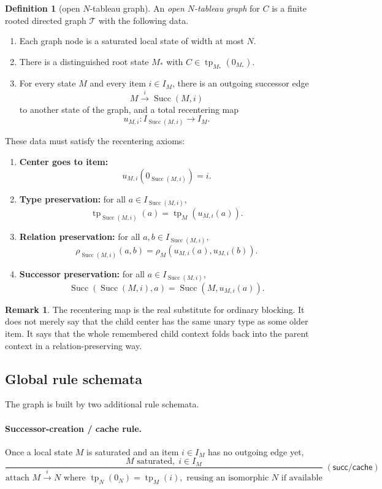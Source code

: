 \documentclass[11pt]{article}
\theoremstyle{definition}
\newtheorem{definition}[theorem]{Definition}
\newtheorem{remark}[theorem]{Remark}
\newcommand{\tp}{\operatorname{tp}}
\newcommand{\Succ}{\operatorname{Succ}}
\begin{document}
\begin{definition}[open $N$-tableau graph]
An \emph{open $N$-tableau graph} for $C$ is a finite rooted directed graph $\mathcal T$ with the following data.
\begin{enumerate}[label=(G\arabic*)]
    \item Each graph node is a saturated local state of width at most $N$.
    \item There is a distinguished root state $M_\ast$ with $C\in \tp_{M_\ast}(0_{M_\ast})$.
    \item For every state $M$ and every item $i\in I_M$, there is an outgoing successor edge
    \[
    M \xrightarrow{i} \Succ(M,i)
    \]
    to another state of the graph, and a total recentering map
    \[
    u_{M,i}: I_{\Succ(M,i)} \to I_M.
    \]
\end{enumerate}
These data must satisfy the recentering axioms:
\begin{enumerate}[label=(R\arabic*)]
    \item \textbf{Center goes to item:}
    \[
    u_{M,i}(0_{\Succ(M,i)})=i.
    \]
    \item \textbf{Type preservation:} for all $a\in I_{\Succ(M,i)}$,
    \[
    \tp_{\Succ(M,i)}(a)=\tp_M(u_{M,i}(a)).
    \]
    \item \textbf{Relation preservation:} for all $a,b\in I_{\Succ(M,i)}$,
    \[
    \rho_{\Succ(M,i)}(a,b)=\rho_M(u_{M,i}(a),u_{M,i}(b)).
    \]
    \item \textbf{Successor preservation:} for all $a\in I_{\Succ(M,i)}$,
    \[
    \Succ(\Succ(M,i),a)=\Succ(M,u_{M,i}(a)).
    \]
\end{enumerate}
\end{definition}

\begin{remark}
The recentering map is the real substitute for ordinary blocking. It does not merely say that the child center has the same unary type as some older item. It says that the whole remembered child context folds back into the parent context in a relation-preserving way.
\end{remark}

\subsection{Global rule schemata}

The graph is built by two additional rule schemata.

\paragraph{Successor-creation / cache rule.}
Once a local state $M$ is saturated and an item $i\in I_M$ has no outgoing edge yet,
\[
\frac{M\text{ saturated},\; i\in I_M}{\text{attach }M\xrightarrow{i}N\text{ where }\tp_N(0_N)=\tp_M(i),\text{ reusing an isomorphic }N\text{ if available}}\; (\mathsf{succ/cache})
\]
\end{document}
